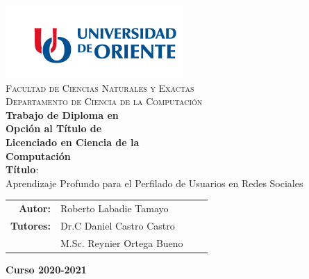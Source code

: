 \documentclass[11pt, letterpaper]{report}
\begin{document}
	\begin{titlepage}
	\begin{minipage}[t]{0.48\textwidth}
		\BgThispage
		\parbox{\textwidth}{}
	\end{minipage}
	\begin{minipage}[t]{0.55\textwidth}
			\parbox{\textwidth}{
				\includegraphics[width=.8\textwidth]{images/logo.png}\\[0.5cm]
				\centering\textsc{Facultad de Ciencias Naturales y Exactas}\\[0.2cm]
				\centering\textsc{Departamento de Ciencia de la Computación}\\[2.2cm]
				\textbf{\LARGE Trabajo de Diploma en\\[-.1cm]Opción al Título de\\[-.1cm]Licenciado en Ciencia de la\\[-.1cm]Computación\\[2.2cm]}
				\Large  \textbf{Título}:\\
				\fontsize{18pt}{20pt}\selectfont Aprendizaje Profundo para el Perfilado de Usuarios en Redes Sociales\\
				\vspace{10mm}
				\begin{tabular}{rp{}ll}
					{\Large \bf Autor:} & {\Large Roberto Labadie Tamayo} \\[.5cm]
					{\Large \bf Tutores:} & {\Large Dr.C Daniel Castro Castro} \\[.1cm]
					& {\Large M.Sc. Reynier Ortega Bueno} \\[.9cm]
				\end{tabular}
				
				\vspace{10mm}
				{\Large \textbf{Curso 2020-2021}}
			}
	\end{minipage}
	\end{titlepage}
	\thispagestyle{empty} 	
	\chapterfont{\flushright}
	
	
	
	\renewcommand{\contentsname}{Contenido} \tableofcontents
	\renewcommand{\listfigurename}{Lista de Figuras} \listoffigures	
	\renewcommand{\listtablename}{Lista de Tablas} \listoftables
	\renewcommand{\tablename}{Tabla}
	\clearpage
	

	
	
	
	
	
	
	
	

	
	
\end{document}
